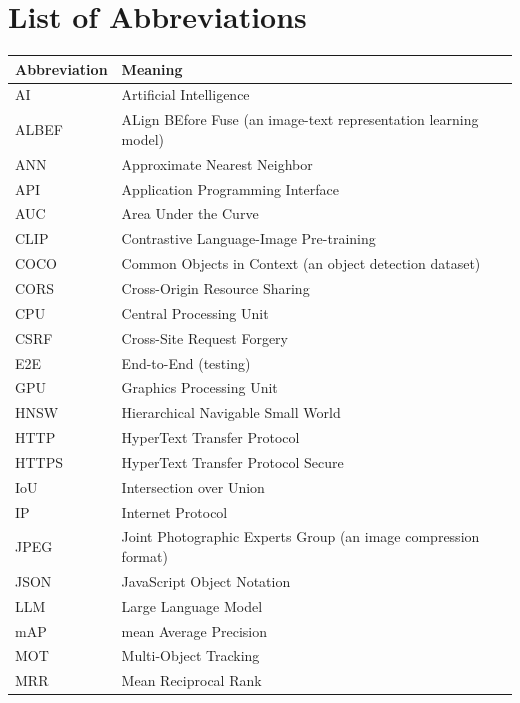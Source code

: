 \chapter*{List of Abbreviations}

\begin{longtable}{|p{3cm}|p{11cm}|}
\hline
\textbf{Abbreviation} & \textbf{Meaning} \\
\hline
\endhead
AI & Artificial Intelligence \\
\hline
ALBEF & ALign BEfore Fuse (an image-text representation learning model) \\
\hline
ANN & Approximate Nearest Neighbor \\
\hline
API & Application Programming Interface \\
\hline
AUC & Area Under the Curve \\
\hline
CLIP & Contrastive Language-Image Pre-training \\
\hline
COCO & Common Objects in Context (an object detection dataset) \\
\hline
CORS & Cross-Origin Resource Sharing \\
\hline
CPU & Central Processing Unit \\
\hline
CSRF & Cross-Site Request Forgery \\
\hline
E2E & End-to-End (testing) \\
\hline
GPU & Graphics Processing Unit \\
\hline
HNSW & Hierarchical Navigable Small World \\
\hline
HTTP & HyperText Transfer Protocol \\
\hline
HTTPS & HyperText Transfer Protocol Secure \\
\hline
IoU & Intersection over Union \\
\hline
IP & Internet Protocol \\
\hline
JPEG & Joint Photographic Experts Group (an image compression format) \\
\hline
JSON & JavaScript Object Notation \\
\hline
LLM & Large Language Model \\
\hline
mAP & mean Average Precision \\
\hline
MOT & Multi-Object Tracking \\
\hline
MRR & Mean Reciprocal Rank \\

\end{longtable}
